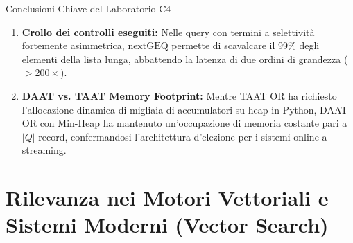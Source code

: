 \begin{table}[H]
\centering
\small
{}
\caption{Risultati sperimentali del laboratorio su porzione C4: latenza di esecuzione tra scansione lineare a passi unitari e scansione accelerata con salti $\text{nextGEQ}$.}
\label{tab:c4-benchmark-results}
\end{table}

\begin{noteblock}{Conclusioni Chiave del Laboratorio C4}
\begin{enumerate}
    \item \textbf{Crollo dei controlli eseguiti:} Nelle query con termini a selettivit\`a fortemente asimmetrica, $\text{nextGEQ}$ permette di scavalcare il $99\%$ degli elementi della lista lunga, abbattendo la latenza di due ordini di grandezza ($> 200\times$).
    \item \textbf{DAAT vs. TAAT Memory Footprint:} Mentre TAAT OR ha richiesto l'allocazione dinamica di migliaia di accumulatori su heap in Python, DAAT OR con Min-Heap ha mantenuto un'occupazione di memoria costante pari a $|Q|$ record, confermandosi l'architettura d'elezione per i sistemi online a streaming.
\end{enumerate}
\end{noteblock}

\section{Rilevanza nei Motori Vettoriali e Sistemi Moderni (Vector Search)}
\label{sec:sistemi-moderni-vector-search}

